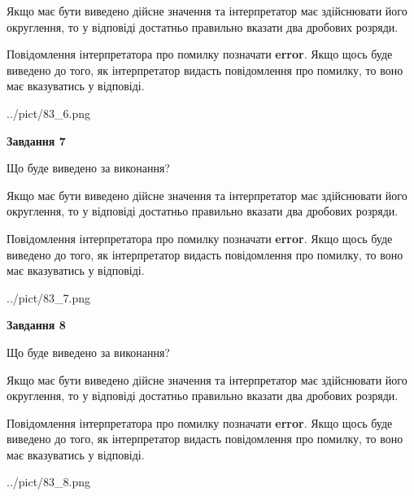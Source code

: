 \documentclass[12pt, ukrainian]{article}
\begin{document}
{\begin {Large}
Якщо має бути виведено дійсне значення та інтерпретатор має здійснювати його округлення, 
то у відповіді достатньо правильно вказати два дробових розряди.

Повідомлення інтерпретатора про помилку позначати \textbf{error}.
Якщо щось буде виведено до того, як інтерпретатор видасть повідомлення про помилку, 
то воно має вказуватись у відповіді. \par

\begin{center}
	{../pict/83_6.png}
\end{center}
\newpage

{\begin {center}\textbf{Завдання 7}\end {center}}\par
Що буде виведено за виконання? \par

Якщо має бути виведено дійсне значення та інтерпретатор має здійснювати його округлення, 
то у відповіді достатньо правильно вказати два дробових розряди.

Повідомлення інтерпретатора про помилку позначати \textbf{error}.
Якщо щось буде виведено до того, як інтерпретатор видасть повідомлення про помилку, 
то воно має вказуватись у відповіді. \par

\begin{center}
	{../pict/83_7.png}
\end{center}
\newpage

{\begin {center}\textbf{Завдання 8}\end {center}}\par
Що буде виведено за виконання? \par

Якщо має бути виведено дійсне значення та інтерпретатор має здійснювати його округлення, 
то у відповіді достатньо правильно вказати два дробових розряди.

Повідомлення інтерпретатора про помилку позначати \textbf{error}.
Якщо щось буде виведено до того, як інтерпретатор видасть повідомлення про помилку, 
то воно має вказуватись у відповіді. \par

\begin{center}
	{../pict/83_8.png}
\end{center}
\newpage


\end{Large}}
\end{document}
